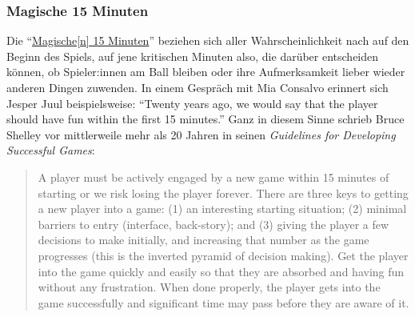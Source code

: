 \documentclass[a5paper,pagesize,numbers=noenddot]{scrbook}
\begin{document}
\subsubsection{Magische 15 Minuten}\label{sec:orpheus_geschichte_abschnitte_minuten}
Die \enquote{\uline{Magische[n] 15 Minuten}} beziehen sich aller Wahrscheinlichkeit nach auf den Beginn des Spiels, auf jene kritischen Minuten also, die darüber entscheiden können, ob Spieler:innen am Ball bleiben oder ihre Aufmerksamkeit lieber wieder anderen Dingen zuwenden.
In einem Gespräch mit Mia Consalvo erinnert sich Jesper Juul beispielsweise:
\enquote{Twenty years ago, we would say that the player should have fun within the first 15 minutes.}\autocite{juul_speedrunning_2020}
Ganz in diesem Sinne schrieb Bruce Shelley vor mittlerweile mehr als 20 Jahren in seinen \textit{Guidelines for Developing Successful Games}:

\begin{quote}
   A player must be actively engaged by a new game within 15 minutes of starting or we risk losing the player forever.
   There are three keys to getting a new player into a game:
   (1) an interesting starting situation; (2) minimal barriers to entry (interface, back-story); and (3) giving the player a few decisions to make initially, and increasing that number as the game progresses (this is the inverted pyramid of decision making).
   Get the player into the game quickly and easily so that they are absorbed and having fun without any frustration.
   When done properly, the player gets into the game successfully and significant time may pass before they are aware of it.\autocite{shelley_guidelines_2001}
\end{quote}
\end{document}
